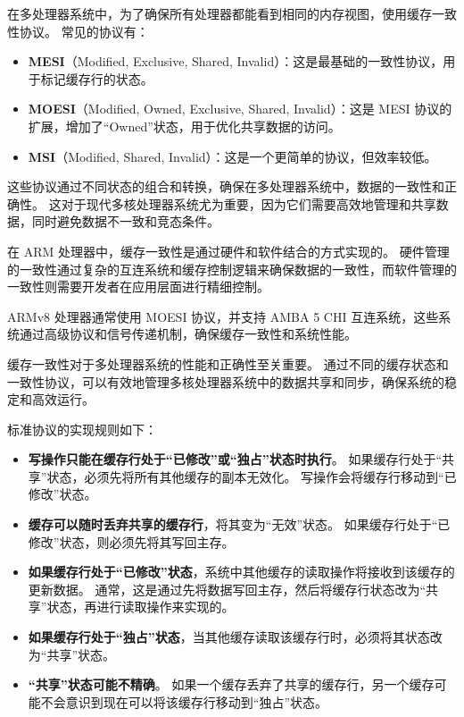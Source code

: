 \begin{Tcbox}[title={扩展}]


在多处理器系统中，为了确保所有处理器都能看到相同的内存视图，使用缓存一致性协议。
常见的协议有：

\begin{itemize}

\item
  \textbf{MESI}（Modified, Exclusive, Shared, Invalid）：这是最基础的一致性协议，用于标记缓存行的状态。
\item
  \textbf{MOESI}（Modified, Owned, Exclusive, Shared, Invalid）：这是 MESI 协议的扩展，增加了“Owned”状态，用于优化共享数据的访问。
\item
  \textbf{MSI}（Modified, Shared, Invalid）：这是一个更简单的协议，但效率较低。
\end{itemize}

这些协议通过不同状态的组合和转换，确保在多处理器系统中，数据的一致性和正确性。
这对于现代多核处理器系统尤为重要，因为它们需要高效地管理和共享数据，同时避免数据不一致和竞态条件。


在 ARM 处理器中，缓存一致性是通过硬件和软件结合的方式实现的。
硬件管理的一致性通过复杂的互连系统和缓存控制逻辑来确保数据的一致性，而软件管理的一致性则需要开发者在应用层面进行精细控制。

ARMv8 处理器通常使用 MOESI 协议，并支持 AMBA 5 CHI 互连系统，这些系统通过高级协议和信号传递机制，确保缓存一致性和系统性能。

缓存一致性对于多处理器系统的性能和正确性至关重要。
通过不同的缓存状态和一致性协议，可以有效地管理多核处理器系统中的数据共享和同步，确保系统的稳定和高效运行。

\end{Tcbox}

标准协议的实现规则如下：

\begin{itemize}
\item
  \textbf{写操作只能在缓存行处于“已修改”或“独占”状态时执行}。
  如果缓存行处于“共享”状态，必须先将所有其他缓存的副本无效化。
  写操作会将缓存行移动到“已修改”状态。
\item
  \textbf{缓存可以随时丢弃共享的缓存行}，将其变为“无效”状态。
  如果缓存行处于“已修改”状态，则必须先将其写回主存。
\item
  \textbf{如果缓存行处于“已修改”状态}，系统中其他缓存的读取操作将接收到该缓存的更新数据。
  通常，这是通过先将数据写回主存，然后将缓存行状态改为“共享”状态，再进行读取操作来实现的。
\item
  \textbf{如果缓存行处于“独占”状态}，当其他缓存读取该缓存行时，必须将其状态改为“共享”状态。
\item
  \textbf{“共享”状态可能不精确}。
  如果一个缓存丢弃了共享的缓存行，另一个缓存可能不会意识到现在可以将该缓存行移动到“独占”状态。
\end{itemize}

